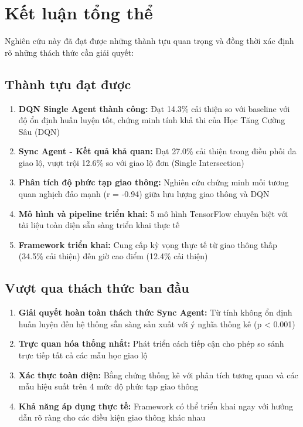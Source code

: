 \section{Kết luận tổng thể}

Nghiên cứu này đã đạt được những thành tựu quan trọng và đồng thời xác định rõ những
thách thức cần giải quyết:

\subsection{Thành tựu đạt được}
\begin{enumerate}
    \item \textbf{DQN Single Agent thành công:} Đạt 14.3\% cải thiện so với baseline
        với độ ổn định huấn luyện tốt, chứng minh tính khả thi của Học Tăng Cường Sâu (DQN)

    \item \textbf{Sync Agent - Kết quả khả quan:} Đạt 27.0\% cải thiện
        trong điều phối đa giao lộ, vượt trội 12.6\% so với giao lộ đơn (Single Intersection)

    \item \textbf{Phân tích độ phức tạp giao thông:} Nghiên cứu       chứng minh mối tương quan nghịch đảo mạnh (r = -0.94) giữa lưu lượng giao thông và DQN

    \item \textbf{Mô hình và pipeline triển khai:} 5 mô hình TensorFlow chuyên biệt
        với tài liệu toàn diện sẵn sàng triển khai thực tế

    \item \textbf{Framework triển khai:} Cung cấp kỳ vọng thực tế
        từ giao thông thấp (34.5\% cải thiện) đến giờ cao điểm (12.4\% cải thiện)
\end{enumerate}

\subsection{Vượt qua thách thức ban đầu}
\begin{enumerate}
    \item \textbf{Giải quyết hoàn toàn thách thức Sync Agent:} Từ tính không ổn định huấn luyện
        đến hệ thống sẵn sàng sản xuất với ý nghĩa thống kê (p < 0.001)

    \item \textbf{Trực quan hóa thống nhất:} Phát triển cách tiếp cận cho phép so sánh trực tiếp tất cả các mẫu học giao lộ

    \item \textbf{Xác thực toàn diện:} Bằng chứng thống kê với phân tích tương quan
        và các mẫu hiệu suất trên 4 mức độ phức tạp giao thông

    \item \textbf{Khả năng áp dụng thực tế:} Framework có thể triển khai ngay với
        hướng dẫn rõ ràng cho các điều kiện giao thông khác nhau
\end{enumerate}


